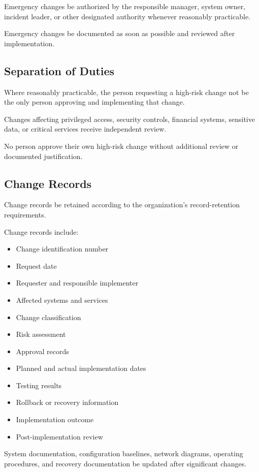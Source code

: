 Emergency changes \must{} be authorized by the responsible manager, system owner, incident leader, or other designated authority whenever reasonably practicable.

Emergency changes \must{} be documented as soon as possible and reviewed after implementation.

\subsection{Separation of Duties}

Where reasonably practicable, the person requesting a high-risk change \should{} not be the only person approving and implementing that change.

Changes affecting privileged access, security controls, financial systems, sensitive data, or critical services \should{} receive independent review.

No person \should{} approve their own high-risk change without additional review or documented justification.

\subsection{Change Records}

Change records \must{} be retained according to the organization's record-retention requirements.

Change records \should{} include:
\begin{itemize}
    \item Change identification number
    \item Request date
    \item Requester and responsible implementer
    \item Affected systems and services
    \item Change classification
    \item Risk assessment
    \item Approval records
    \item Planned and actual implementation dates
    \item Testing results
    \item Rollback or recovery information
    \item Implementation outcome
    \item Post-implementation review
\end{itemize}

System documentation, configuration baselines, network diagrams, operating procedures, and recovery documentation \must{} be updated after significant changes.

